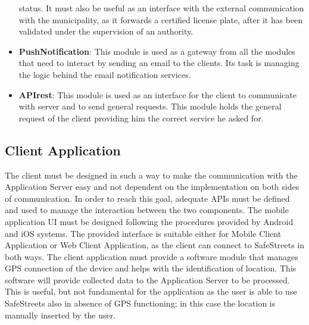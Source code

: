 \begin{itemize}
  status. It must also be useful as an interface with the external communication with the municipality, as it forwards a 
  certified license plate, after it has been validated under the supervision of an authority.
  \item \textbf{PushNotification}: This module is used as a gateway from all the modules that need to interact by 
  sending an email to the clients. Its task is managing the logic behind the email notification services.
  \item \textbf{APIrest}: This module is used as an interface for the client to communicate with server and to send
  general requests. This module holds the general request of the client providing him the correct service he asked for.
\end{itemize}

\subsection{Client Application}
The client must be designed in such a way to make the communication with the Application Server easy and not dependent 
on the implementation on both sides of communication. In order to reach this goal, adequate APIs must be defined and used 
to manage the interaction between the two components. The mobile application UI must be designed following the procedures 
provided by Android and iOS systems. The provided interface is suitable either for Mobile Client Application or Web Client Application,
as the client can connect to SafeStreets in both ways.
\newline The client application must provide a software module that manages GPS connection of the device and helps with 
the identification of location. This software will provide collected data to the Application Server to be processed. This 
is useful, but not fundamental for the application as the user is able to use SafeStreets also in absence of GPS 
functioning; in this case the location is manually inserted by the user.

